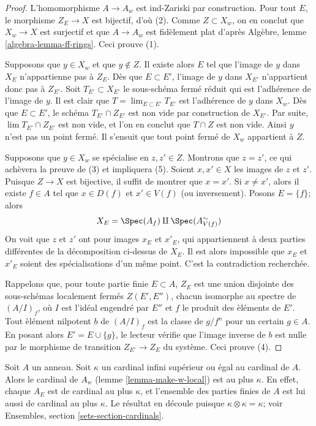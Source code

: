 \begin{proof}
L'homomorphisme $A \to A_w$ est ind-Zariski par construction.
Pour tout $E$, le morphisme $Z_E \to X$ est bijectif, d'o\`u (2).
Comme $Z \subset X_w$, on en conclut que $X_w \to X$ est surjectif et que
$A \to A_w$ est fid\`element plat d'apr\`es
Alg\`ebre, lemme \ref{algebra-lemma-ff-rings}. Ceci prouve (1).

\medskip\noindent
Supposons que $y \in X_w$ et que $y \not \in Z$. Il existe alors
$E$ tel que l'image de $y$ dans $X_E$ n'appartienne pas \`a
$Z_E$. D\`es que $E \subset E'$, l'image de $y$ dans $X_{E'}$
n'appartient donc pas \`a $Z_{E'}$. Soit $T_{E'} \subset X_{E'}$ le sous-sch\'ema
ferm\'e r\'eduit qui est l'adh\'erence de l'image de $y$. Il est
clair que $T = \lim_{E \subset E'} T_{E'}$ est l'adh\'erence de $y$ dans $X_w$.
D\`es que $E \subset E'$, le sch\'ema $T_{E'} \cap Z_{E'}$ est non vide
par construction de $X_{E'}$. Par suite, $\lim T_{E'} \cap Z_{E'}$ est non vide,
et l'on en conclut que $T \cap Z$ est non vide. Ainsi $y$ n'est pas un point ferm\'e.
Il s'ensuit que tout point ferm\'e de $X_w$ appartient \`a $Z$.

\medskip\noindent
Supposons que $y \in X_w$ se sp\'ecialise en $z, z' \in Z$. Montrons que
$z = z'$, ce qui ach\`evera la preuve de (3) et impliquera (5).
Soient $x, x' \in X$ les images de $z$ et $z'$. Puisque $Z \to X$ est
bijective, il suffit de montrer que $x = x'$. Si $x \not = x'$, alors
il existe $f \in A$ tel que $x \in D(f)$ et $x' \in V(f)$
(ou inversement). Posons $E = \{f\}$; alors
$$
X_E = \Spec(A_f) \amalg \Spec(A_{V(f)}^\sim)
$$
On voit que $z$ et $z'$ ont pour images $x_E$ et $x'_E$, qui appartiennent \`a deux
parties diff\'erentes de la d\'ecomposition ci-dessus de $X_E$. Il est alors impossible
que $x_E$ et $x'_E$ soient des sp\'ecialisations d'un m\^eme point.
C'est la contradiction recherch\'ee.

\medskip\noindent
Rappelons que, pour toute partie finie $E \subset A$, $Z_E$
est une union disjointe des sous-sch\'emas localement ferm\'es $Z(E', E'')$,
chacun isomorphe au spectre de $(A/I)_f$, o\`u $I$ est l'id\'eal
engendr\'e par $E''$ et $f$ le produit des \`el\'ements de $E'$.
Tout \`el\'ement nilpotent $b$ de $(A/I)_f$ est la classe de $g/f^n$
pour un certain $g \in A$. En posant alors $E' = E \cup \{g\}$, le lecteur
v\'erifie que l'image inverse de $b$ est nulle par le morphisme de transition
$Z_{E'} \to Z_E$ du syst\`eme. Ceci prouve (4).
\end{proof}

\begin{remark}
\label{remark-size-w}
Soit $A$ un anneau. Soit $\kappa$ un cardinal infini sup\'erieur ou
\'egal au cardinal de $A$. Alors le cardinal de $A_w$
(lemme \ref{lemma-make-w-local})
est au plus $\kappa$. En effet, chaque $A_E$ est de cardinal au plus
$\kappa$, et l'ensemble des parties finies de $A$ est lui aussi de cardinal au plus $\kappa$.
Le r\'esultat en d\'ecoule puisque $\kappa \otimes \kappa = \kappa$; voir
Ensembles, section \ref{sets-section-cardinals}.
\end{remark}

